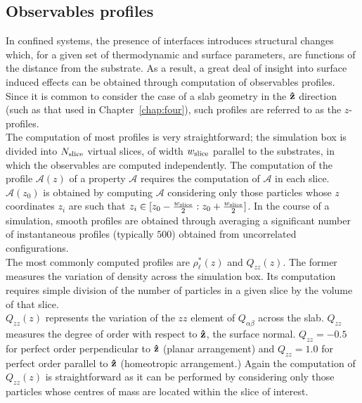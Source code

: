 \subsection{Observables profiles}

In confined systems, the presence of interfaces introduces structural changes
which, for a given set of thermodynamic and surface parameters, are functions of the distance 
from the substrate. As a result, a great deal of insight into surface induced effects can be
obtained through computation of observables profiles. Since it is common to consider the case of 
a slab geometry in the $\mathbf{\hat{z} }$ direction (such as that used in Chapter~\ref{chap:four}),
such profiles are referred to as the $z$-profiles.\\

The computation of most profiles is very straightforward; the simulation box is
divided into $N_{\mathrm{slice}}$ virtual slices, of width $w_{\mathrm{slice}}$ parallel to the
substrates, in which the  observables are computed independently.
The computation of the profile $\mathcal{A}(z)$ of a property $\mathcal{A}$ 
requires the computation of $\mathcal{A}$ in each slice. $\mathcal{A}(z_0)$ is obtained by
computing $\mathcal{A}$ considering only those particles whose $z$ coordinates $z_i$ are such that 
$z_i \in [z_0 - \frac{w_{\mathrm{slice}}}{2} : z_0 + \frac{w_{\mathrm{slice}}}{2}]$.
In the course of a simulation, smooth profiles are obtained through averaging a significant
number of instantaneous profiles (typically $500$) obtained from uncorrelated configurations.\\

The most commonly computed profiles are $\rho^{*}_\ell(z)$ and $Q_{zz}(z)$. The former
measures the variation of density across the simulation box. Its computation requires simple
division of the number of particles in a given slice by the volume of that slice.\\
%
$Q_{zz}(z)$ represents the variation of the $zz$ element of $Q_{\alpha\beta}$ across the slab.
$Q_{zz}$ measures the degree of order with respect to $\mathbf{\hat{z} }$, the surface normal. 
$Q_{zz} = -0.5$ for perfect
order perpendicular to $\mathbf{\hat{z} }$ (planar arrangement) and $Q_{zz} = 1.0$ for perfect 
order parallel to $\mathbf{\hat{z} }$ (homeotropic arrangement.) Again the computation of $Q_{zz}(z)$ 
is straightforward as it can be performed by considering only those particles whose centres of 
mass are located within the slice of interest.\\

